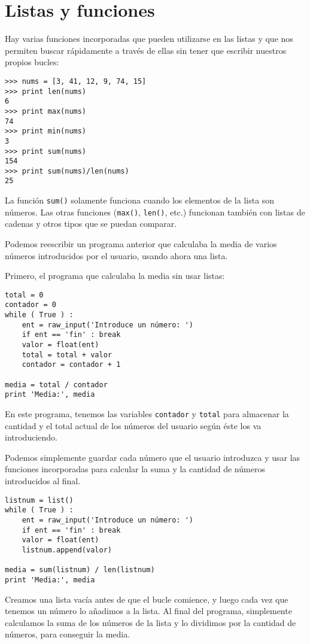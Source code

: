 \section{Listas y funciones}

Hay varias funciones incorporadas que pueden utilizarse en las listas
y que nos permiten buscar rápidamente a través de ellas
sin tener que escribir nuestros propios bucles:

\beforeverb
\begin{verbatim}
>>> nums = [3, 41, 12, 9, 74, 15]
>>> print len(nums)
6
>>> print max(nums)
74
>>> print min(nums)
3
>>> print sum(nums)
154
>>> print sum(nums)/len(nums)
25
\end{verbatim}
\afterverb
%
La función {\tt sum()} solamente funciona cuando los elementos de la lista son números.
Las otras funciones ({\tt max()}, {\tt len()}, etc.) funcionan también con listas
de cadenas y otros tipos que se puedan comparar.

Podemos reescribir un programa anterior que calculaba la media de
varios números introducidos por el usuario, usando ahora una lista.

Primero, el programa que calculaba la media sin usar listas:

\beforeverb
\begin{verbatim}
total = 0
contador = 0
while ( True ) :
    ent = raw_input('Introduce un número: ')
    if ent == 'fin' : break
    valor = float(ent)
    total = total + valor
    contador = contador + 1

media = total / contador
print 'Media:', media
\end{verbatim}
\afterverb
%
En este programa, tenemos las variables {\tt contador} y {\tt total}
para almacenar la cantidad y el total actual de los números del usuario
según éste los va introduciendo.

Podemos simplemente guardar cada número que el usuario introduzca
y usar las funciones incorporadas para calcular la suma y la cantidad
de números introducidos al final.

\beforeverb
\begin{verbatim}
listnum = list()
while ( True ) :
    ent = raw_input('Introduce un número: ')
    if ent == 'fin' : break
    valor = float(ent)
    listnum.append(valor)

media = sum(listnum) / len(listnum)
print 'Media:', media
\end{verbatim}
\afterverb
%
Creamos una lista vacía antes de que el bucle comience, y luego cada vez
que tenemos un número lo añadimos a la lista. Al final del
programa, simplemente calculamos la suma de los números de la
lista y lo dividimos por la cantidad de números,
para conseguir la media.


